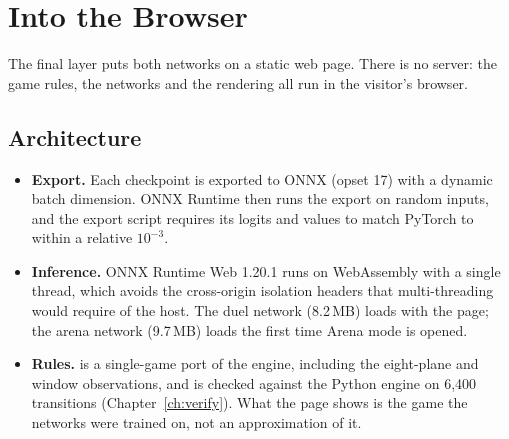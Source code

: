 \chapter{Into the Browser}\label{ch:browser}

The final layer puts both networks on a static web page. There is no server: the game
rules, the networks and the rendering all run in the visitor's browser.

\section{Architecture}

\begin{center}
\end{center}

\begin{itemize}
\item \textbf{Export.} Each checkpoint is exported to ONNX (opset 17) with a dynamic batch
  dimension. ONNX Runtime then runs the export on random inputs, and the export
  script requires its logits and values to match PyTorch to within a relative $10^{-3}$.
\item \textbf{Inference.} ONNX Runtime Web 1.20.1 runs on WebAssembly with a single
  thread, which avoids the cross-origin isolation headers that multi-threading would
  require of the host. The duel network (8.2\,MB) loads with the page; the arena network
  (9.7\,MB) loads the first time Arena mode is opened.
\item \textbf{Rules.}  is a single-game port of the engine, including the
  eight-plane and window observations, and is checked against the Python engine on
  6{,}400 transitions (Chapter~\ref{ch:verify}). What the page shows is the game the
  networks were trained on, not an approximation of it.
\end{itemize}

